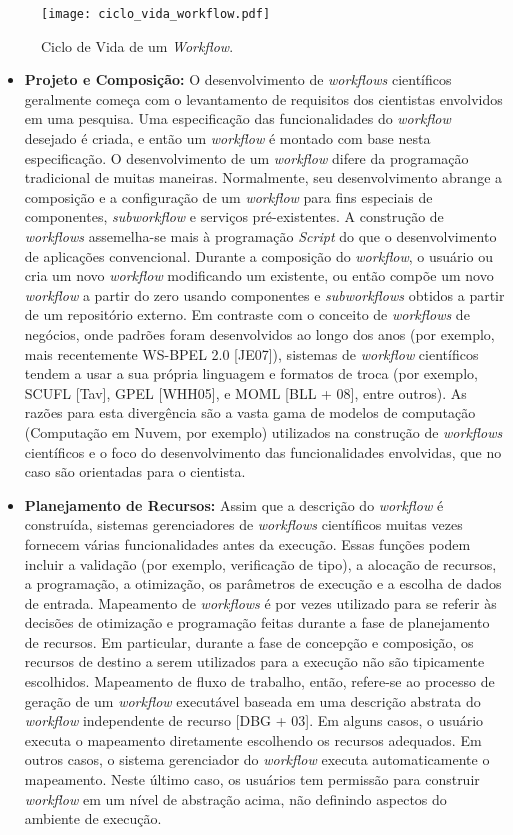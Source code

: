 \begin{figure}[H]
	\centering
	\texttt{[image: ciclo\_vida\_workflow.pdf]}
	\caption{Ciclo de Vida de um \textit{Workflow}.}
	\label{fig:ciclo_vida_workflow}
\end{figure}

\begin{itemize}
	\item \textbf{Projeto e Composição:} O desenvolvimento de \textit{workflows} científicos geralmente começa com o levantamento de requisitos dos cientistas envolvidos em uma pesquisa. Uma especificação das funcionalidades do \textit{workflow} desejado é criada, e então um \textit{workflow} é montado com base nesta especificação. O desenvolvimento de um \textit{workflow} difere da programação tradicional de muitas maneiras. Normalmente, seu desenvolvimento abrange a composição e a configuração de um \textit{workflow} para fins especiais de componentes, \textit{subworkflow} e serviços pré-existentes. A construção de \textit{workflows} assemelha-se mais à programação \textit{Script} do que o desenvolvimento de aplicações convencional. Durante a composição do \textit{workflow}, o usuário ou cria um novo \textit{workflow} modificando um existente, ou então compõe um novo \textit{workflow} a partir do zero usando componentes e \textit{subworkflows} obtidos a partir de um repositório externo. Em contraste com o conceito de \textit{workflows} de negócios, onde padrões foram desenvolvidos ao longo dos anos (por exemplo, mais recentemente WS-BPEL 2.0 [JE07]), sistemas de \textit{workflow} científicos tendem a usar a sua própria linguagem e formatos de troca (por exemplo, SCUFL [Tav], GPEL [WHH05], e MOML [BLL + 08], entre outros). As razões para esta divergência são a vasta gama de modelos de computação (Computação em Nuvem, por exemplo) utilizados na construção de \textit{workflows} científicos e o foco do desenvolvimento das funcionalidades envolvidas, que no caso são orientadas para o cientista.
    \item \textbf{Planejamento de Recursos:} Assim que a descrição do \textit{workflow} é construída, sistemas gerenciadores de \textit{workflows} científicos muitas vezes fornecem várias funcionalidades antes da execução. Essas funções podem incluir a validação (por exemplo, verificação de tipo), a alocação de recursos, a programação, a otimização, os parâmetros de execução e a escolha de dados de entrada. Mapeamento de \textit{workflows} é por vezes utilizado para se referir às decisões de otimização e programação feitas durante a fase de planejamento de recursos. Em particular, durante a fase de concepção e composição, os recursos de destino a serem utilizados para a execução não são tipicamente escolhidos. Mapeamento de fluxo de trabalho, então, refere-se ao processo de geração de um \textit{workflow} executável baseada em uma descrição abstrata do \textit{workflow} independente de recurso [DBG + 03]. Em alguns casos, o usuário executa o mapeamento diretamente escolhendo os recursos adequados. Em outros casos, o sistema gerenciador do \textit{workflow} executa automaticamente o mapeamento. Neste último caso, os usuários tem permissão para construir \textit{workflow} em um nível de abstração acima, não definindo aspectos do ambiente de execução.

\end{itemize}
